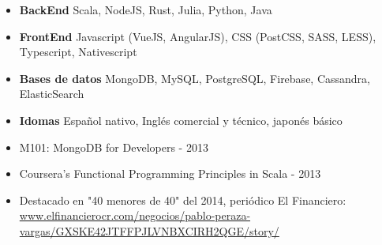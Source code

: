	\begin{itemize}[leftmargin=*]
		\item \textbf{BackEnd} Scala, NodeJS, Rust, Julia, Python, Java
		\item \textbf{FrontEnd} Javascript (VueJS, AngularJS), CSS (PostCSS, SASS, LESS), Typescript, Nativescript
		\item \textbf{Bases de datos} MongoDB, MySQL, PostgreSQL, Firebase, Cassandra, ElasticSearch
		\item \textbf{Idomas} Español nativo, Inglés comercial y técnico, japonés básico
	\end{itemize}
	
	\begin{itemize}[leftmargin=*]
		\item M101: MongoDB for Developers - 2013
		\item Coursera’s Functional Programming Principles in Scala - 2013
		\item Destacado en "40 menores de 40" del 2014, periódico El Financiero: \href{https://www.elfinancierocr.com/negocios/pablo-peraza-vargas/GXSKE42JTFFPJLVNBXCIRH2QGE/story/}{www.elfinancierocr.com/negocios/pablo-peraza-vargas/GXSKE42JTFFPJLVNBXCIRH2QGE/story/}
	\end{itemize}